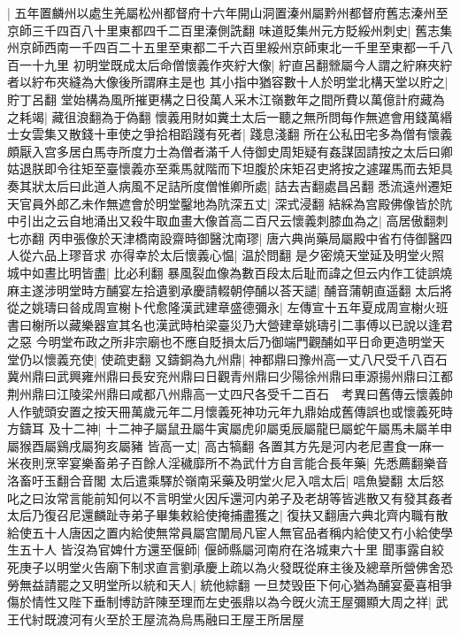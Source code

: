 |{
	五年置麟州以處生羌屬松州都督府十六年開山洞置溱州屬黔州都督府舊志溱州至京師三千四百八十里東都四千二百里溱側詵翻}
味道貶集州元方貶綏州刺史|{
	舊志集州京師西南一千四百二十五里至東都二千六百里綏州京師東北一千里至東都一千八百一十九里}
初明堂既成太后命僧懷義作夾紵大像|{
	紵直呂翻檾屬今人謂之紵麻夾紵者以紵布夾縫為大像後所謂麻主是也}
其小指中猶容數十人於明堂北構天堂以貯之|{
	貯丁呂翻}
堂始構為風所摧更構之日役萬人采木江嶺數年之間所費以萬億計府藏為之耗竭|{
	藏徂浪翻為于偽翻}
懷義用財如糞土太后一聽之無所問每作無遮會用錢萬緡士女雲集又散錢十車使之爭拾相蹈踐有死者|{
	踐息淺翻}
所在公私田宅多為僧有懷義頗厭入宫多居白馬寺所度力士為僧者滿千人侍御史周矩疑有姦謀固請按之太后曰卿姑退朕即令往矩至臺懷義亦至乘馬就階而下坦腹於床矩召吏將按之遽躍馬而去矩具奏其狀太后曰此道人病風不足詰所度僧惟卿所處|{
	詰去吉翻處昌呂翻}
悉流遠州遷矩天官員外郎乙未作無遮會於明堂鑿地為阬深五丈|{
	深式浸翻}
結綵為宫殿佛像皆於阬中引出之云自地涌出又殺牛取血畫大像首高二百尺云懷義刺膝血為之|{
	高居傲翻刺七亦翻}
丙申張像於天津橋南設齋時御醫沈南璆|{
	唐六典尚藥局屬殿中省冇侍御醫四人從六品上璆音求}
亦得幸於太后懷義心愠|{
	温於問翻}
是夕密燒天堂延及明堂火照城中如晝比明皆盡|{
	比必利翻}
暴風裂血像為數百段太后耻而諱之但云内作工徒誤燒麻主遂涉明堂時方酺宴左拾遺劉承慶請輟朝停酺以荅天譴|{
	酺音蒲朝直遥翻}
太后將從之姚璹曰㫺成周宣榭卜代愈隆漢武建章盛德彌永|{
	左傳宣十五年夏成周宣榭火班書曰榭所以藏樂器宣其名也漢武時柏梁臺災乃大營建章姚璹引二事傅以已說以逢君之惡}
今明堂布政之所非宗廟也不應自貶損太后乃御端門觀酺如平日命更造明堂天堂仍以懷義充使|{
	使疏吏翻}
又鑄銅為九州鼎|{
	神都鼎曰豫州高一丈八尺受千八百石冀州鼎曰武興雍州鼎曰長安兖州鼎曰日觀青州鼎曰少陽徐州鼎曰車源揚州鼎曰江都荆州鼎曰江陵梁州鼎曰咸都八州鼎高一丈四尺各受千二百石　考異曰舊傳云懷義帥人作號頭安置之按天冊萬歲元年二月懷義死神功元年九鼎始成舊傳誤也或懷義死時方鑄耳}
及十二神|{
	十二神子屬鼠丑屬牛寅屬虎卯屬兎辰屬龍巳屬蛇午屬馬未屬羊申屬猴酉屬鷄戌屬狗亥屬豬}
皆高一丈|{
	高古犒翻}
各置其方先是河内老尼晝食一麻一米夜則烹宰宴樂畜弟子百餘人淫穢靡所不為武什方自言能合長年藥|{
	先悉薦翻樂音洛畜吁玉翻合音閣}
太后遣乘驛於嶺南采藥及明堂火尼入唁太后|{
	唁魚變翻}
太后怒叱之曰汝常言能前知何以不言明堂火因斥還河内弟子及老胡等皆逃散又有發其姦者太后乃復召尼還麟趾寺弟子畢集敕給使掩捕盡獲之|{
	復扶又翻唐六典北齊内職有散給使五十人唐因之置内給使無常員屬宫闈局凡宦人無官品者稱内給使又冇小給使學生五十人}
皆沒為官婢什方還至偃師|{
	偃師縣屬河南府在洛城東六十里}
聞事露自絞死庚子以明堂火告廟下制求直言劉承慶上疏以為火發既從麻主後及總章所營佛舍恐勞無益請罷之又明堂所以統和天人|{
	統他綜翻}
一旦焚毁臣下何心猶為酺宴憂喜相爭傷於情性又陛下垂制博訪許陳至理而左史張鼎以為今旣火流王屋彌顯大周之祥|{
	武王代紂既渡河有火至於王屋流為烏馬融曰王屋王所居屋}
